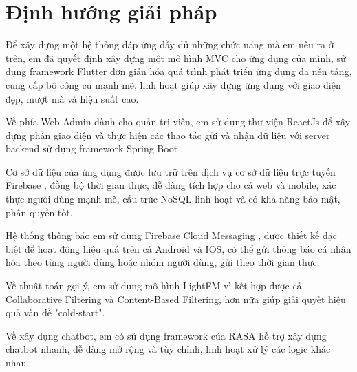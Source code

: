\documentclass[../DoAn.tex]{subfiles}
\begin{document}
\section{Định hướng giải pháp}
\label{section:1.3}
Để xây dựng một hệ thống đáp ứng đầy đủ những chức năng mà em nêu ra ở trên, em đã quyết định xây dựng một mô hình MVC cho ứng dụng của mình, sử dụng framework  Flutter \cite{Flutter} đơn giản hóa quá trình phát triển ứng dụng đa nền tảng,  cung cấp bộ công cụ mạnh mẽ, linh hoạt giúp xây dựng ứng dụng với giao diện đẹp, mượt mà và hiệu suất cao.

Về phía Web Admin dành cho quản trị viên, em sử dụng thư viện ReactJs \cite{ReactJS} để xây dựng phần giao diện và thực hiện các thao tác gửi và nhận dữ liệu với server backend sử dụng framework Spring Boot \cite{SpringBoot}.

Cơ sở dữ liệu của ứng dụng được lưu trữ trên dịch vụ cơ sở dữ liệu trực tuyến Firebase \cite{Firebase}, đồng bộ thời gian thực, dễ dàng tích hợp cho cả web và mobile, xác thực người dùng mạnh mẽ, cấu trúc NoSQL linh hoạt và có khả năng bảo mật, phân quyền tốt.

Hệ thống thông báo em sử dụng Firebase Cloud Messaging \cite{FirebaseCloudMessaging}, được thiết kế đặc biệt để hoạt động hiệu quả trên cả Android và IOS, có thể gửi thông báo cá nhân hóa theo từng người dùng hoặc nhóm người dùng, gửi theo thời gian thực.

Về thuật toán gợi ý, em sử dụng mô hình LightFM \cite{LightFM} vì kết hợp được cả Collaborative Filtering và Content-Based Filtering, hơn nữa giúp giải quyết hiệu quả vấn đề "cold-start".

Về xây dụng chatbot, em có sử dụng framework của RASA \cite{RasaFramework} hỗ trợ xây dựng chatbot nhanh, dễ dàng mở rộng và tùy chỉnh, linh hoạt xử lý các logic khác nhau.
\end{document}
